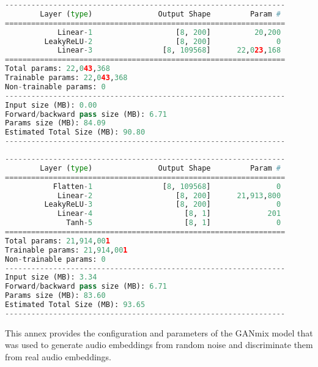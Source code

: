 \begin{lstlisting}[language=Python, caption=Generator summary, label=lst:gen-summary]
----------------------------------------------------------------
        Layer (type)               Output Shape         Param #
================================================================
            Linear-1                   [8, 200]          20,200
         LeakyReLU-2                   [8, 200]               0
            Linear-3                [8, 109568]      22,023,168
================================================================
Total params: 22,043,368
Trainable params: 22,043,368
Non-trainable params: 0
----------------------------------------------------------------
Input size (MB): 0.00
Forward/backward pass size (MB): 6.71
Params size (MB): 84.09
Estimated Total Size (MB): 90.80
----------------------------------------------------------------

\end{lstlisting}

\begin{lstlisting}[language=Python, caption=Discriminator summary, label=lst:dis-summary]
----------------------------------------------------------------
        Layer (type)               Output Shape         Param #
================================================================
           Flatten-1                [8, 109568]               0
            Linear-2                   [8, 200]      21,913,800
         LeakyReLU-3                   [8, 200]               0
            Linear-4                     [8, 1]             201
              Tanh-5                     [8, 1]               0
================================================================
Total params: 21,914,001
Trainable params: 21,914,001
Non-trainable params: 0
----------------------------------------------------------------
Input size (MB): 3.34
Forward/backward pass size (MB): 6.71
Params size (MB): 83.60
Estimated Total Size (MB): 93.65
----------------------------------------------------------------

\end{lstlisting}

This annex provides the configuration and parameters of the GANmix model that was used to generate audio embeddings from random noise and discriminate them from real audio embeddings.
